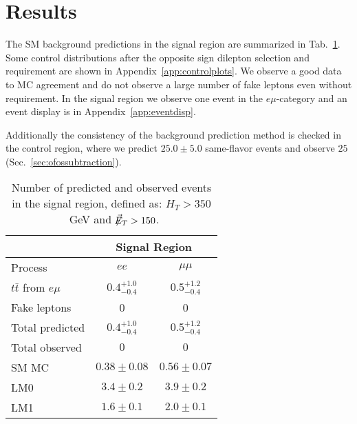 \section{Results}\label{sec:results}

The SM background predictions in the signal region are summarized in Tab.~\ref{tab:results}. 
Some control distributions after the opposite sign dilepton selection and \HT requirement are shown
in Appendix~\ref{app:controlplots}. 
We observe a good data to MC agreement and do not observe a large number of fake leptons even without
\MET requirement.
In the signal region we observe one event in the $e\mu$-category and an event display is in Appendix~\ref{app:eventdisp}.



Additionally the consistency of the background prediction method is 
checked in the control region, where we predict $25.0 \pm 5.0$ 
same-flavor events and observe $25$ (Sec.~\ref{sec:ofossubtraction}).


\begin{table}[hbt]
\begin{center}
\caption{\label{tab:results}Number of predicted and observed events in the signal region, defined as: $H_T > 350$~GeV and $\not\!\!\vec{E}_{T}> 150$.}
\begin{tabular}{l|cc}
\hline
                       &   \multicolumn{2}{c}{Signal Region}          \\
\hline 
Process                      & $ee$                   & $\mu\mu$  \\
\hline
$t\bar{t}$ from $e\mu$    & $0.4 {}_{-0.4}^{+1.0}$ & $0.5 {}_{-0.4}^{+1.2}$  \\
Fake leptons                & 0                      & 0                        \\
\hline
Total predicted         & $0.4 {}_{-0.4}^{+1.0}$ & $0.5 {}_{-0.4}^{+1.2}$   \\
\hline\hline
Total observed                   & $0$                    & $0$  \\
\hline \hline
SM MC         & $0.38\pm 0.08$         & $0.56 \pm 0.07$ \\
LM0                    & $3.4\pm0.2$            & $3.9\pm0.2$  \\
LM1                    & $1.6\pm0.1$            & $2.0\pm0.1$  \\

\hline
\end{tabular}
\end{center}
\end{table}

